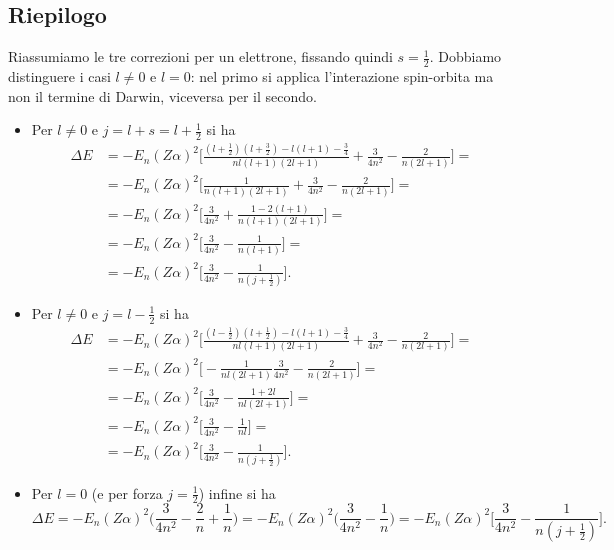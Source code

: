 \subsection{Riepilogo}
Riassumiamo le tre correzioni per un elettrone, fissando quindi $s=\frac12$.
Dobbiamo distinguere i casi $l\ne 0$ e $l=0$: nel primo si applica l'interazione spin-orbita ma non il termine di Darwin, viceversa per il secondo.
\begin{itemize}
    \item Per $l\ne 0$ e $j=l+s=l+\frac12$ si ha
        \begin{equation}
            \begin{split}
                \Delta E&=
                -E_n(Z\alpha)^2\biggl[\frac{(l+\frac12)(l+\frac32)-l(l+1)-\frac34}{nl(l+1)(2l+1)}+\frac3{4n^2}-\frac2{n(2l+1)}\biggr]=\\&=
                -E_n(Z\alpha)^2\biggl[\frac1{n(l+1)(2l+1)}+\frac3{4n^2}-\frac2{n(2l+1)}\biggr]=\\&=
                -E_n(Z\alpha)^2\biggl[\frac3{4n^2}+\frac{1-2(l+1)}{n(l+1)(2l+1)}\biggr]=\\&=
                -E_n(Z\alpha)^2\biggl[\frac3{4n^2}-\frac1{n(l+1)}\biggr]=\\&=
                -E_n(Z\alpha)^2\biggl[\frac3{4n^2}-\frac1{n(j+\frac12)}\biggr].
            \end{split}
        \end{equation}
    \item Per $l\ne 0$ e $j=l-\frac12$ si ha
        \begin{equation}
            \begin{split}
                \Delta E&=
                -E_n(Z\alpha)^2\biggl[\frac{(l-\frac12)(l+\frac12)-l(l+1)-\frac34}{nl(l+1)(2l+1)}+\frac3{4n^2}-\frac2{n(2l+1)}\biggr]=\\&=
                -E_n(Z\alpha)^2\biggl[-\frac1{nl(2l+1)}\frac3{4n^2}-\frac2{n(2l+1)}\biggr]=\\&=
                -E_n(Z\alpha)^2\biggl[\frac3{4n^2}-\frac{1+2l}{nl(2l+1)}\biggr]=\\&=
                -E_n(Z\alpha)^2\biggl[\frac3{4n^2}-\frac1{nl}\biggr]=\\&=
                -E_n(Z\alpha)^2\biggl[\frac3{4n^2}-\frac1{n(j+\frac12)}\biggr].
            \end{split}
        \end{equation}
    \item Per $l=0$ (e per forza $j=\frac12$) infine si ha
        \begin{equation}
            \Delta E=
            -E_n(Z\alpha)^2\biggl(\frac3{4n^2}-\frac2{n}+\frac1{n}\biggr)=
            -E_n(Z\alpha)^2\biggl(\frac3{4n^2}-\frac1{n}\biggr)=
            -E_n(Z\alpha)^2\biggl[\frac3{4n^2}-\frac1{n(j+\frac12)}\biggr].
        \end{equation}
\end{itemize}
